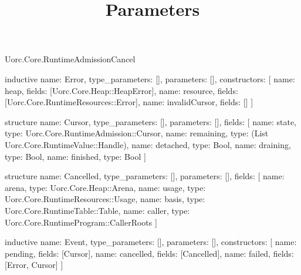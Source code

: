 \begin{lexlean}{Uorc.Core.RuntimeAdmissionCancel}
\title{Parameters}
\begin{semanticmodule}
inductive{
  name: Error,
  type_parameters: [],
  parameters: [],
  constructors: [
    {name: heap, fields: [Uorc.Core.Heap::HeapError]},
    {name: resource, fields: [Uorc.Core.RuntimeResources::Error]},
    {name: invalidCursor, fields: []}
  ]
}

structure{
  name: Cursor,
  type_parameters: [],
  parameters: [],
  fields: [
    {name: state, type: Uorc.Core.RuntimeAdmission::Cursor},
    {name: remaining, type: (List Uorc.Core.RuntimeValue::Handle)},
    {name: detached, type: Bool},
    {name: draining, type: Bool},
    {name: finished, type: Bool}
  ]
}

structure{
  name: Cancelled,
  type_parameters: [],
  parameters: [],
  fields: [
    {name: arena, type: Uorc.Core.Heap::Arena},
    {name: usage, type: Uorc.Core.RuntimeResources::Usage},
    {name: basis, type: Uorc.Core.RuntimeTable::Table},
    {name: caller, type: Uorc.Core.RuntimeProgram::CallerRoots}
  ]
}

inductive{
  name: Event,
  type_parameters: [],
  parameters: [],
  constructors: [
    {name: pending, fields: [Cursor]},
    {name: cancelled, fields: [Cancelled]},
    {name: failed, fields: [Error, Cursor]}
  ]
}


\end{semanticmodule}
\end{lexlean}
